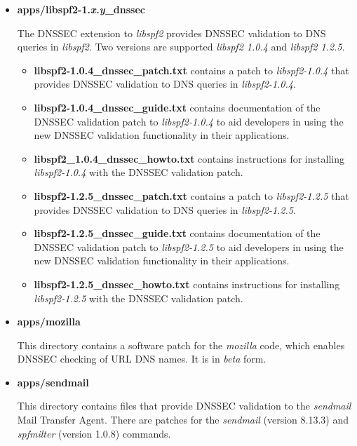 \documentclass[12pt]{article}
\newcommand{\cmd}[1]{{\em #1}}
\newcommand{\lib}[1]{{\em #1}}
\newcommand{\path}[1]{{\bf #1}}
\begin{document}
\begin{itemize}

\item{\path{apps/libspf2-1.{\it x.y}\_dnssec}}

The DNSSEC extension to \lib{libspf2} provides DNSSEC validation to DNS
queries in \lib{libspf2}.
Two versions are supported \lib{libspf2 1.0.4} and \lib{libspf2 1.2.5}.

\begin{itemize}
\item \path{libspf2-1.0.4\_dnssec\_patch.txt} contains a patch to
\lib{libspf2-1.0.4} that provides DNSSEC validation to DNS queries in
\lib{libspf2-1.0.4}.

\item \path{libspf2-1.0.4\_dnssec\_guide.txt} contains documentation
of the DNSSEC validation patch to \lib{libspf2-1.0.4} to aid developers in
using the new DNSSEC validation functionality in their applications.

\item \path{libspf2\_1.0.4\_dnssec\_howto.txt} contains instructions for
installing \lib{libspf2-1.0.4} with the DNSSEC validation patch.

\item \path{libspf2-1.2.5\_dnssec\_patch.txt} contains a patch to
\lib{libspf2-1.2.5} that provides DNSSEC validation to DNS queries in
\lib{libspf2-1.2.5}.

\item \path{libspf2-1.2.5\_dnssec\_guide.txt} contains documentation
of the DNSSEC validation patch to \lib{libspf2-1.2.5} to aid developers in
using the new DNSSEC validation functionality in their applications.

\item \path{libspf2-1.2.5\_dnssec\_howto.txt} contains instructions for
installing \lib{libspf2-1.2.5} with the DNSSEC validation patch.

\end{itemize}

\item{\path{apps/mozilla}}

This directory contains a software patch for the \cmd{mozilla} code, which
enables DNSSEC checking of URL DNS names.  It is in {\it beta} form.

\item{\path{apps/sendmail}}

This directory contains files that provide DNSSEC validation to
the \cmd{sendmail} Mail Transfer Agent.  There are patches for the
\cmd{sendmail} (version 8.13.3) and \cmd{spfmilter} (version 1.0.8) commands.


\end{itemize}
\end{document}
